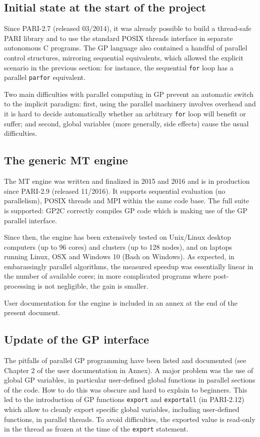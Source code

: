 \documentclass{deliverablereport}
\begin{document}
\subsection{Initial state at the start of the project}
Since PARI-2.7 (released 03/2014), it was already possible to build a
thread-safe PARI library and to use the standard POSIX threads interface in
separate autonomous C programs. The GP language also contained a handful of
parallel control structures, mirroring sequential equivalents, which
allowed the explicit scenario in the previous section: for instance, the
sequential \texttt{for} loop has a parallel \texttt{parfor} equivalent.

Two main difficulties with parallel computing in GP prevent an automatic
switch to the implicit paradigm: first, using the parallel machinery
involves overhead and it is hard to decide automatically whether
an arbitrary \texttt{for} loop will benefit or suffer; and second,
global variables (more generally, side effects) cause the usual difficulties.

\subsection{The generic MT engine}
The MT engine was written and finalized in 2015 and 2016 and is in
production since PARI-2.9 (released 11/2016). It supports sequential
evaluation (no parallelism), POSIX threads and MPI within the same code
base. The full suite is supported: GP2C correctly compiles GP code which is
making use of the GP parallel interface.

Since then, the engine has been extensively tested on Unix/Linux
desktop computers (up to 96 cores) and clusters (up to 128 nodes), and on
laptops running Linux, OSX and Windows 10 (Bash on Windows). As expected, in
embarassingly parallel algorithms, the measured speedup was essentially
linear in the number of available cores; in more complicated programs where
post-processing is not negligible, the gain is smaller.

User documentation for the engine is included in an annex at the end of the
present document.

\subsection{Update of the GP interface}

The pitfalls of parallel GP programming have been listed and documented
(see Chapter 2 of the user documentation in Annex). A major problem was the
use of global GP variables, in particular user-defined global functions
in parallel sections of the code. How to do this was obscure and hard to
explain to beginners. This led to the introduction of GP functions
\texttt{export} and \texttt{exportall} (in PARI-2.12) which allow to cleanly
export specific global variables, including user-defined functions, in
parallel threads. To avoid difficulties, the exported value is read-only in
the thread as frozen at the time of the \texttt{export} statement.
\end{document}
